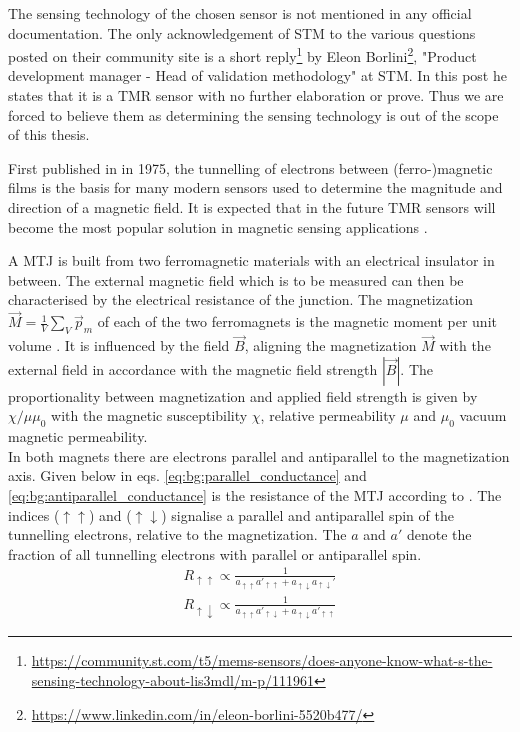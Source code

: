 The sensing technology of the chosen sensor is not mentioned in any official documentation. The only acknowledgement of \ac{STM} to the various questions posted on their community site is a short reply\footnote{\url{https://community.st.com/t5/mems-sensors/does-anyone-know-what-s-the-sensing-technology-about-lis3mdl/m-p/111961}} by Eleon Borlini\footnote{\url{https://www.linkedin.com/in/eleon-borlini-5520b477/}}, "Product development manager - Head of validation methodology" at \ac{STM}. In this post he states that it is a \ac{TMR} sensor with no further elaboration or prove. Thus we are forced to believe them as determining the sensing technology is out of the scope of this thesis.

First published in \cite{JULLIERE1975} in 1975, the tunnelling of electrons between (ferro-)magnetic films is the basis for many modern sensors used to determine the magnitude and direction of a magnetic field. It is expected that in the future \ac{TMR} sensors will become the most popular solution in magnetic sensing applications \cite{yan2022}.

A \ac{MTJ} is built from two ferromagnetic materials with an electrical insulator in between. The external magnetic field which is to be measured can then be characterised by the electrical resistance of the junction. The magnetization $\vec{M}=\frac1V\sum_V\vec{p}_m$ of each of the two ferromagnets is the magnetic moment per unit volume \cite{Demtröder2017-eo}. It is influenced by the field $\vec{B}$, aligning the magnetization $\vec{M}$ with the external field in accordance with the magnetic field strength $
|\vec{B}|$. The proportionality between magnetization and applied field strength is given by $\chi/\mu\mu_0$ with the magnetic susceptibility $\chi$, relative permeability $\mu$ and $\mu_0$ vacuum magnetic permeability.\\
In both magnets there are electrons parallel and antiparallel to the magnetization axis. Given below in eqs. \eqref{eq:bg:parallel_conductance} and \eqref{eq:bg:antiparallel_conductance} is the resistance of the \ac{MTJ} according to \cite{JULLIERE1975}. The indices ($\uparrow\uparrow$) and ($\uparrow\downarrow$) signalise a parallel and antiparallel spin of the tunnelling electrons, relative to the magnetization. The $a$ and $a'$ denote the fraction of all tunnelling electrons with parallel or antiparallel spin.
\begin{align}
    R_{\uparrow\uparrow}\propto \frac{1}{a^{}_{\uparrow\uparrow}a'_{\uparrow\uparrow}+a^{}_{\uparrow\downarrow}a_{\uparrow\downarrow}'}
    \label{eq:bg:parallel_conductance} \\
     R_{\uparrow\downarrow}\propto \frac{1}{a^{}_{\uparrow\uparrow}a'_{\uparrow\downarrow}+a^{}_{\uparrow\downarrow}a'_{\uparrow\uparrow}}
     \label{eq:bg:antiparallel_conductance}
\end{align}

